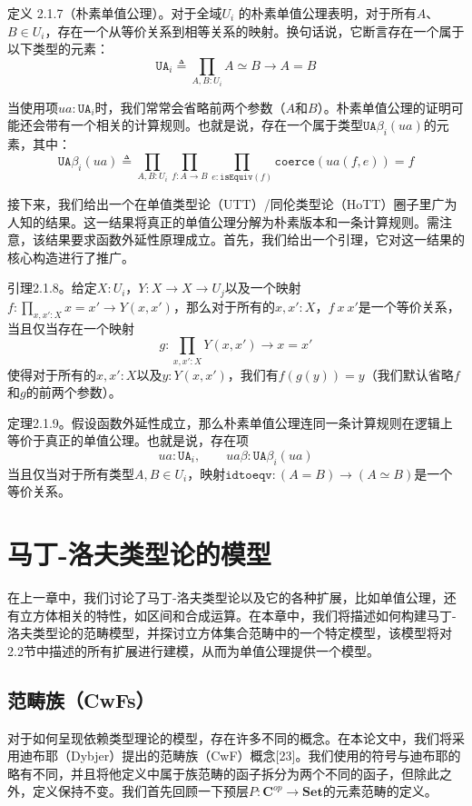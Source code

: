 \documentclass{ctexrep}
\theoremstyle{plain}
\theoremstyle{definition}
\theoremstyle{remark}
\newcommand\Set{\mathbf{Set}}
\newcommand\C{\mathbf{C}}
\begin{document}
定义 2.1.7（朴素单值公理）。对于全域\(U_{i}\) 的朴素单值公理表明，对于所有\(A\)、\(B \in U_{i}\)，存在一个从等价关系到相等关系的映射。换句话说，它断言存在一个属于以下类型的元素：
\[\mathtt{UA}_{i} \triangleq \prod_{A, B: U_{i}} A \simeq B \to A = B\] 

当使用项\(ua : \mathtt{UA}_{i}\)时，我们常常会省略前两个参数（\(A\)和\(B\)）。朴素单值公理的证明可能还会带有一个相关的计算规则。也就是说，存在一个属于类型\(\mathtt{UA}\beta_{i}(ua)\)的元素，其中：
\[\mathtt{UA}\beta_{i}(ua) \triangleq \prod_{A, B: U_{i}} \prod_{f: A \to B} \prod_{e: \mathtt{isEquiv}(f)} \mathtt{coerce}(ua(f, e)) = f\] 

接下来，我们给出一个在单值类型论（UTT）/同伦类型论（HoTT）圈子里广为人知的结果。这一结果将真正的单值公理分解为朴素版本和一条计算规则。需注意，该结果要求函数外延性原理成立。首先，我们给出一个引理，它对这一结果的核心构造进行了推广。 

引理2.1.8。给定\(X: U_{i}\)，\(Y: X \to X \to U_{j}\)以及一个映射\(f: \prod_{x, x': X} x = x' \to Y(x, x')\)，那么对于所有的\(x, x': X\)，\(f\ x\ x'\)是一个等价关系，当且仅当存在一个映射
\[g: \prod_{x, x': X} Y\left(x, x'\right) \to x = x'\]
使得对于所有的\(x, x': X\)以及\(y: Y(x, x')\)，我们有\(f(g(y)) = y\)（我们默认省略\(f\)和\(g\)的前两个参数）。 

定理2.1.9。假设函数外延性成立，那么朴素单值公理连同一条计算规则在逻辑上等价于真正的单值公理。也就是说，存在项
\[ua: \mathtt{UA}_{i}, \qquad ua\beta: \mathtt{UA}\beta_{i}(ua)\]
当且仅当对于所有类型\(A, B \in U_{i}\)，映射\(\mathtt{idtoeqv}: (A = B) \to (A \simeq B)\)是一个等价关系。 

\chapter{马丁-洛夫类型论的模型}

在上一章中，我们讨论了马丁-洛夫类型论以及它的各种扩展，比如单值公理，还有立方体相关的特性，如区间和合成运算。在本章中，我们将描述如何构建马丁-洛夫类型论的范畴模型，并探讨立方体集合范畴中的一个特定模型，该模型将对2.2节中描述的所有扩展进行建模，从而为单值公理提供一个模型。 

\section{范畴族（CwFs）}

对于如何呈现依赖类型理论的模型，存在许多不同的概念。在本论文中，我们将采用迪布耶（Dybjer）提出的范畴族（CwF）概念[23]。我们使用的符号与迪布耶的略有不同，并且将他定义中属于族范畴的函子拆分为两个不同的函子，但除此之外，定义保持不变。我们首先回顾一下预层\(P: \C^{op} \to \Set\)的元素范畴的定义。
\end{document}
